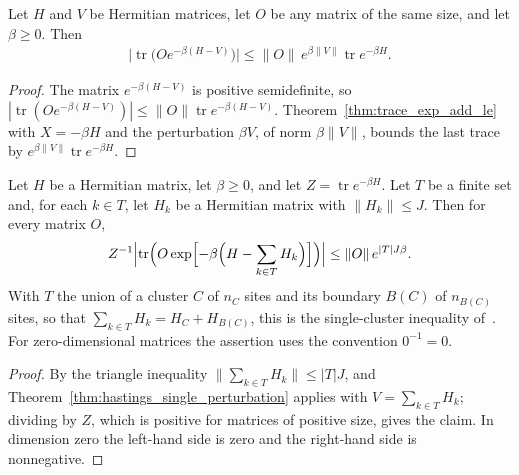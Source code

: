 \begin{theorem}
    \label{thm:hastings_single_perturbation}
    \leanok
    Let $H$ and $V$ be Hermitian matrices, let $O$ be any matrix of the same size,
    and let $\beta\ge0$. Then
    \begin{align}
        \label{eq:trace_exponential_single_perturbation}
        \bigl|\operatorname{tr}\bigl(Oe^{-\beta(H-V)}\bigr)\bigr|
        \le\|O\|\,e^{\beta\|V\|}\operatorname{tr}e^{-\beta H}.
    \end{align}
\end{theorem}
\begin{proof}\leanok
    The matrix $e^{-\beta(H-V)}$ is positive semidefinite, so
    $|\operatorname{tr}(Oe^{-\beta(H-V)})|\le\|O\|\operatorname{tr}e^{-\beta(H-V)}$.
    Theorem~\ref{thm:trace_exp_add_le} with $X=-\beta H$ and the perturbation
    $\beta V$, of norm $\beta\|V\|$, bounds the last trace by
    $e^{\beta\|V\|}\operatorname{tr}e^{-\beta H}$.
\end{proof}

\begin{theorem}
    \label{thm:hastings_single_cluster_bound}
    \leanok
    Let $H$ be a Hermitian matrix, let $\beta\ge0$, and let
    $Z=\operatorname{tr}e^{-\beta H}$. Let $T$ be a finite set and, for each
    $k\in T$, let $H_k$ be a Hermitian matrix with $\|H_k\|\le J$. Then for every
    matrix $O$,
    \begin{align}
        \label{eq:trace_exponential_finite_perturbation}
        Z^{-1}\Bigl|\operatorname{tr}\Bigl(O\exp\Bigl[-\beta\Bigl(H-\sum_{k\in T}H_k
            \Bigr)\Bigr]\Bigr)\Bigr|\le\|O\|\,e^{|T|J\beta}.
    \end{align}
    With $T$ the union of a cluster $C$ of $n_C$ sites and its boundary $B(C)$ of
    $n_{B(C)}$ sites, so that $\sum_{k\in T}H_k=H_C+H_{B(C)}$, this is
    the single-cluster inequality of~\cite[lines 1141--1175]{Hastings2006Solving}.
    For zero-dimensional matrices the assertion uses the convention $0^{-1}=0$.
\end{theorem}
\begin{proof}\leanok
    By the triangle inequality $\|\sum_{k\in T}H_k\|\le|T|J$, and
    Theorem~\ref{thm:hastings_single_perturbation} applies with
    $V=\sum_{k\in T}H_k$; dividing by $Z$, which is positive for matrices of
    positive size, gives the claim. In dimension zero the left-hand side is
    zero and the right-hand side is nonnegative.
\end{proof}
